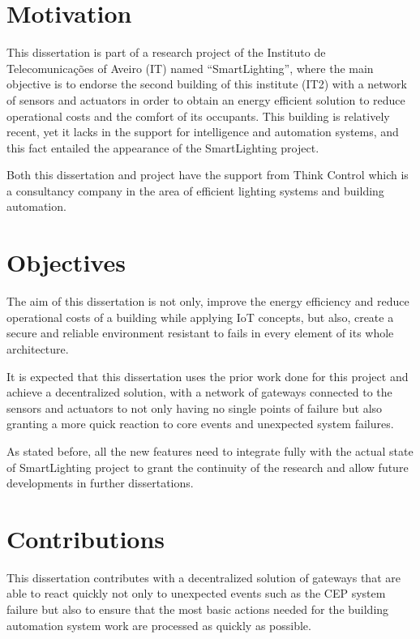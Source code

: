 \section{Motivation}

This dissertation is part of a research project of the Instituto de Telecomunicações of Aveiro (IT) named ``SmartLighting'', where the main objective is to endorse the second building of this institute (IT2) with a network of sensors and actuators in order to obtain an energy efficient solution to reduce operational costs and the comfort of its occupants. This building is relatively recent, yet it lacks in the support for intelligence and automation systems, and this fact entailed the appearance of the SmartLighting project. 

Both this dissertation and project have the support from Think Control which is a consultancy company in the area of efficient lighting systems and building automation.

\section{Objectives}

The aim of this dissertation is not only, improve the energy efficiency and reduce operational costs of a building while applying IoT concepts, but also, create a secure and reliable environment resistant to fails in every element of its whole architecture.

It is expected that this dissertation uses the prior work done for this project and achieve a decentralized solution, with a network of gateways connected to the sensors and actuators to not only having no single points of failure but also granting a more quick reaction to core events and unexpected system failures.

As stated before, all the new features need to integrate fully with the actual state of SmartLighting project to grant the continuity of the research and allow future developments in further dissertations.

\section{Contributions}

This dissertation contributes with a decentralized solution of gateways that are able to react quickly not only to unexpected events such as the CEP system failure but also to ensure that the most basic actions needed for the building automation system work are processed as quickly as possible.

